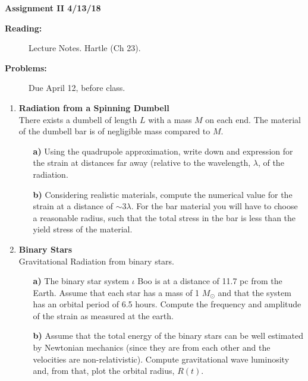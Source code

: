\documentclass[11pt]{article}
\begin{document}
%
\centerline{\large\bf  \hfill Assignment II \hfill  4/13/18}

\medskip
\begin{description}
\item[{\bf Reading:}] Lecture Notes. Hartle (Ch 23). \\
\item[{\bf Problems:} \hfill ] Due April 12, before class.
\end{description}


\medskip

\begin{enumerate}

\item
{\bf Radiation from a Spinning Dumbell} \\
There exists a dumbell of length $L$ with a mass $M$ on each end. The
material of the dumbell bar is of negligible mass compared to $M$.
\begin{itemize}

\item[\bf a)] Using the quadrupole approximation, write down and
  expression for the strain at distances far away (relative to the
  wavelength, $\lambda$, of the radiation.

\item[\bf b)] Considering realistic materials, compute the numerical
  value for the strain at a distance of $\sim 3 \lambda$. For the bar
  material you will have to choose a reasonable radius, such that the
  total stress in the bar is less than the yield stress of the
  material.

\end{itemize}

\item
{\bf Binary Stars} \\
Gravitational Radiation from binary stars.
\begin{itemize}

\item[\bf a)] The binary star system $\iota$ Boo is at a distance of
  11.7 pc from the Earth. Assume that each star has a mass of 1
  $M_{\odot}$ and that the system has an orbital period of 6.5
  hours. Compute the frequency and amplitude of the strain as measured
  at the earth.

\item[\bf b)] Assume that the total energy of the binary stars can
  be well estimated by Newtonian mechanics (since they are from each
  other and the velocities are non-relativistic). Compute
  gravitational wave luminosity and, from that, plot the orbital
  radius, $R(t)$.


\end{itemize}
\end{enumerate}
\end{document}
